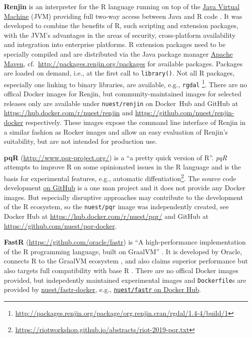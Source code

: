 \textbf{Renjin} is an interpreter for the R language running on top of
the \href{https://en.wikipedia.org/wiki/Java_virtual_machine}{Java
Virtual Machine} (JVM) providing full two-way access between Java and R
code \citep{wikipedia_renjin_2018}. It was developed to combine the
benefits of R, such scripting and extension packages, with the JVM's
advantages in the areas of security, cross-platform availability and
integration into enterprise platforms. R extension packages need to be
specially compiled and are distributed via the Java package manager
\href{https://en.wikipedia.org/wiki/Apache_Maven}{Apache Maven},
cf.~\url{http://packages.renjin.org/packages} for available packages.
Packages are loaded on demand, i.e., at the first call to
\texttt{library()}. Not all R packages, especially one linking to binary
libraries, are available, e.g., \texttt{rgdal}
\footnote{\href{http://packages.renjin.org/package/org.renjin.cran/rgdal/1.4-4/build/1}{http://packages.renjin.org/package/org.renjin.cran/rgdal/1.4-4/build/1}}.
There are no offical Docker images for Renjin, but community-maintained
images for selected releases only are available under
\texttt{nuest/renjin} on Docker~Hub and GitHub at
\url{https://hub.docker.com/r/nuest/renjin} and
\url{https://github.com/nuest/renjin-docker} respectively. These images
expose the command line interface of Renjin in a similar fashion as
Rocker images and allow an easy evaluation of Renjin's suitability, but
are not intended for production use.

\textbf{pqR} (\url{http://www.pqr-project.org/}) is a ``a pretty quick
version of R''. \emph{pqR} attempts to improve R on some opinionated
issues in the R language and is the basis for experimental features,
e.g., automatic
diffentiation\footnote{\href{https://riotworkshop.github.io/abstracts/riot-2019-pqr.txt}{https://riotworkshop.github.io/abstracts/riot-2019-pqr.txt}}.
The source code development
\href{https://github.com/radfordneal/pqR/}{on GitHub} is a one man
project and it does not provide any Docker images. But especially
disruptive approaches may contribute to the development of the R
ecosystem, so the \texttt{nuest/pqr} image was independently created,
see Docker Hub at \url{https://hub.docker.com/r/nuest/pqr/} and GitHub
at \url{https://github.com/nuest/pqr-docker}.

\textbf{FastR} (\url{https://github.com/oracle/fastr}) is ``A
high-performance implementation of the R programming language, built on
GraalVM'' \citep{oracle_labs_oraclefastr_2020}. It is developed by
Oracle, connects R to the GraalVM ecosystem
\citep{wikipedia_graalvm_2019}, and also claims superior performance but
also targets full compatibility with base R
\citep{oracle_labs_oraclefastr_2020}. There are no offical Docker images
provided, but indepedently maintained experimental images and
\texttt{Dockerfile}s are provided by
\href{https://github.com/nuest/fastr-docker}{nuest/fastr-docker}, e.g.,
\href{https://cloud.docker.com/repository/docker/nuest/fastr/}{\texttt{nuest/fastr}
on Docker Hub}.

